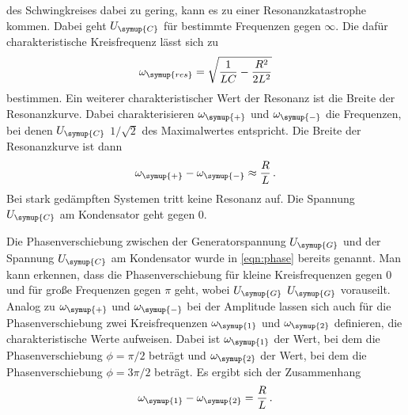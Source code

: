 des Schwingkreises dabei zu gering, kann es zu einer Resonanzkatastrophe kommen.
Dabei geht $U_{\symup{C}}$ für bestimmte Frequenzen gegen $\infty$.
Die dafür charakteristische Kreisfrequenz lässt sich zu
\begin{equation}
  \omega_{\symup{res}}=\sqrt{\frac{1}{LC}-\frac{R^2}{2L^2}}
\end{equation}
bestimmen. Ein weiterer charakteristischer Wert der Resonanz ist die Breite
der Resonanzkurve. Dabei charakterisieren $\omega_{\symup{+}}$ und $\omega_{\symup{-}}$
die Frequenzen, bei denen $U_{\symup{C}}$ $1/\sqrt{2}$ des Maximalwertes entspricht.
Die Breite der Resonanzkurve ist dann
\begin{equation}
  \omega_{\symup{+}} - \omega_{\symup{-}} \approx \frac{R}{L} \,.
\end{equation}
Bei stark gedämpften Systemen tritt keine Resonanz auf. Die Spannung $U_{\symup{C}}$
am Kondensator geht gegen $0$.

Die Phasenverschiebung zwischen der Generatorspannung $U_{\symup{G}}$ und der
Spannung $U_{\symup{C}}$ am Kondensator wurde in \eqref{eqn:phase} bereits genannt.
Man kann erkennen, dass die Phasenverschiebung für kleine Kreisfrequenzen gegen
$0$ und für große Frequenzen gegen $\pi$ geht, wobei $U_{\symup{G}}$ $U_{\symup{G}}$
vorauseilt. Analog zu $\omega_{\symup{+}}$ und $\omega_{\symup{-}}$ bei der Amplitude
lassen sich auch für die Phasenverschiebung zwei Kreisfrequenzen $\omega_{\symup{1}}$
und $\omega_{\symup{2}}$ definieren, die charakteristische Werte aufweisen. Dabei
ist $\omega_{\symup{1}}$ der Wert, bei dem die Phasenverschiebung $\phi=\pi/2$ beträgt
und $\omega_{\symup{2}}$ der Wert, bei dem die Phasenverschiebung $\phi=3\pi/2$ beträgt.
Es ergibt sich der Zusammenhang
\begin{equation}
  \omega_{\symup{1}}-\omega_{\symup{2}}=\frac{R}{L}\,.
\end{equation}

